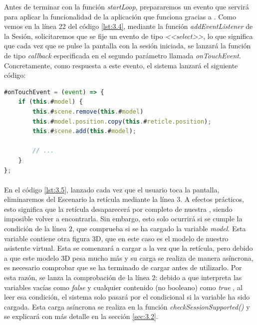 \documentclass{subfiles}
\begin{document}
        Antes de terminar con la función \textit{startLoop}, prepararemos un evento que servirá para aplicar la funcionalidad de la aplicación que funciona gracias a \hittest. Como vemos en la línea 22 del código \ref{lst:3.4}, mediante la función \textit{addEventListener} de la Sesión, solicitaremos que se fije un evento de tipo \textit{<<select>>}, lo que significa que cada vez que se pulse la pantalla con la sesión iniciada, se lanzará la función de tipo \textit{callback} especificada en el segundo parámetro llamada \textit{onTouchEvent}. Concretamente, como respuesta a este evento, el sistema lanzará el siguiente código:

\begin{lstlisting}[language=JavaScript, caption={Respuesta al evento de tipo <<select>>.}, label={lst:3.5}]
#onTouchEvent = (event) => {
    if (this.#model) {
        this.#scene.remove(this.#model)
        this.#model.position.copy(this.#reticle.position);
        this.#scene.add(this.#model);
        
        // ...
    }
};
\end{lstlisting}

        \paragraph{}
        En el código \ref{lst:3.5}, lanzado cada vez que el usuario toca la pantalla, eliminaremos del Escenario la retícula mediante la línea 3. A efectos prácticos, esto significa que la retícula desaparecerá por completo de nuestra \ra, siendo imposible volver a encontrarla. Sin embargo, esto solo ocurrirá si se cumple la condición de la línea 2, que comprueba si se ha cargado la variable \textit{model}. Esta variable contiene otra figura 3D, que en este caso es el modelo de nuestro asistente virtual. Esta se comenzará a cargar a la vez que la retícula, pero debido a que este modelo 3D pesa mucho más y su carga se realiza de manera asíncrona, es necesario comprobar que se ha terminado de cargar antes de utilizarlo. Por esta razón, se lanza la comprobación de la línea 2: debido a que \js interpreta las variables vacías como \textit{false} y cualquier contenido (no booleano) como \textit{true} \cite{web:mozilla_booleanevaluation}, al leer esa condición, el sistema solo pasará por el condicional si la variable ha sido cargada. Esta carga asíncrona se realiza en la función \textit{checkSessionSupported()} y se explicará con más detalle en la sección \ref{sec:3.2}.
        
\end{document}
